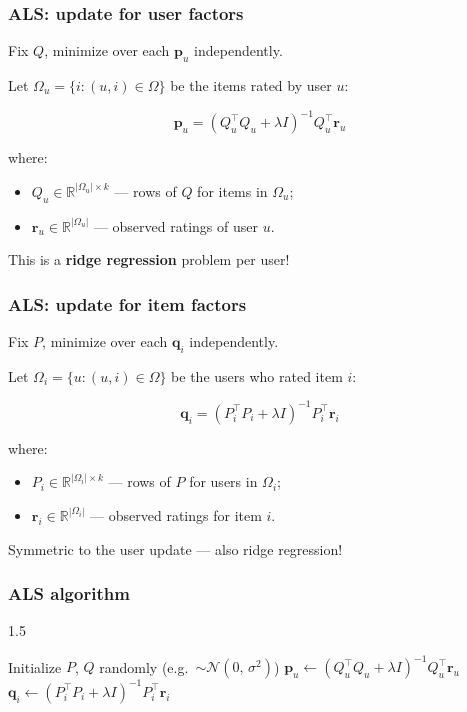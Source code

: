 \documentclass[]{beamer}
\begin{document}
\begin{frame}[fragile]
\frametitle{ALS: update for user factors}
Fix $Q$, minimize over each $\mathbf{p}_u$ independently.

Let $\Omega_u = \{i : (u,i) \in \Omega\}$ be the items rated by user $u$:

\begin{equation*}
\mathbf{p}_u = \left(Q_u^\top Q_u + \lambda I\right)^{-1} Q_u^\top \mathbf{r}_u
\end{equation*}

where:
\begin{itemize}
  \item $Q_u \in \mathbb{R}^{|\Omega_u| \times k}$ --- rows of $Q$ for items in $\Omega_u$;
  \item $\mathbf{r}_u \in \mathbb{R}^{|\Omega_u|}$ --- observed ratings of user $u$.
\end{itemize}

This is a \textbf{ridge regression} problem per user!

\end{frame}

\begin{frame}[fragile]
\frametitle{ALS: update for item factors}
Fix $P$, minimize over each $\mathbf{q}_i$ independently.

Let $\Omega_i = \{u : (u,i) \in \Omega\}$ be the users who rated item $i$:

\begin{equation*}
\mathbf{q}_i = \left(P_i^\top P_i + \lambda I\right)^{-1} P_i^\top \mathbf{r}_i
\end{equation*}

where:
\begin{itemize}
  \item $P_i \in \mathbb{R}^{|\Omega_i| \times k}$ --- rows of $P$ for users in $\Omega_i$;
  \item $\mathbf{r}_i \in \mathbb{R}^{|\Omega_i|}$ --- observed ratings for item $i$.
\end{itemize}

Symmetric to the user update --- also ridge regression!

\end{frame}

\begin{frame}[fragile]
\frametitle{ALS algorithm}
\begin{framed}
\begin{spacing}{1.5}
\begin{algorithmic}[1]
  \State Initialize $P$, $Q$ randomly (e.g.\ $\sim \mathcal{N}(0,\,\sigma^2)$)
  \Repeat
      \State $\mathbf{p}_u \leftarrow \left(Q_u^\top Q_u + \lambda I\right)^{-1} Q_u^\top \mathbf{r}_u$
    \EndFor
      \State $\mathbf{q}_i \leftarrow \left(P_i^\top P_i + \lambda I\right)^{-1} P_i^\top \mathbf{r}_i$
    \EndFor
\end{algorithmic}
\end{spacing}
\end{framed}

\end{frame}
\end{document}
